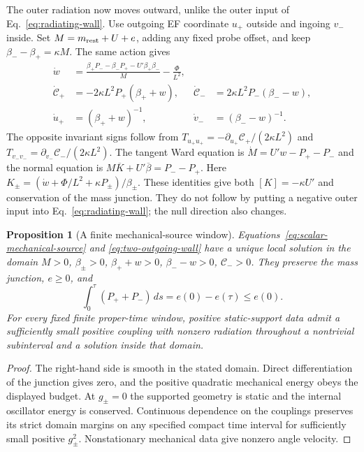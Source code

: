 \documentclass[12pt,a4paper]{article}
\newtheorem{proposition}[theorem]{Proposition}
\begin{document}
The outer radiation now moves outward, unlike the outer input of
Eq.~\eqref{eq:radiating-wall}. Use outgoing EF coordinate $u_+$ outside
and ingoing $v_-$ inside. Set $M=m_{\rm rest}+U+e$, adding any fixed
probe offset, and keep $\beta_--\beta_+=\kappa M$. The same action gives
\begin{align}\label{eq:two-outgoing-wall}
 \dot w&=\frac{\beta_+P_- -\beta_-P_+ -U'\beta_+\beta_-}{M}
                       -\frac\Phi{L^2},\\
 \dot{\mathcal C}_+&=-2\kappa L^2P_+(\beta_++w),&
 \dot{\mathcal C}_-&= 2\kappa L^2P_-(\beta_--w),\nonumber\\
 \dot u_+&=(\beta_++w)^{-1},&
 \dot v_-&=(\beta_--w)^{-1}.\nonumber
\end{align}
The opposite invariant signs follow from
$T_{u_+u_+}=-\partial_{u_+}\mathcal C_+/(2\kappa L^2)$ and
$T_{v_-v_-}=\partial_{v_-}\mathcal C_-/(2\kappa L^2)$.
The tangent Ward equation is $\dot M=U'w-P_+-P_-$ and the normal
equation is $M\overline K+U'\overline\beta=P_--P_+$.
Here $K_\pm=(\dot w+\Phi/L^2+\kappa P_\pm)/\beta_\pm$.
These identities give both $[K]=-\kappa U'$ and conservation of the
mass junction. They do not follow by putting a negative outer input
into Eq.~\eqref{eq:radiating-wall}; the null direction also changes.

\begin{proposition}[A finite mechanical-source window]
\label{prop:mechanical-source-window}
Equations~\eqref{eq:scalar-mechanical-source} and
\eqref{eq:two-outgoing-wall} have a unique local solution in the domain
$M>0$, $\beta_\pm>0$, $\beta_++w>0$, $\beta_--w>0$, $\mathcal C_->0$.
They preserve the mass junction, $e\ge0$, and
\begin{equation}\label{eq:mechanical-source-budget}
 \int_0^\tau(P_++P_-)\,ds=e(0)-e(\tau)\le e(0).
\end{equation}
For every fixed finite proper-time window, positive static-support data
admit a sufficiently small positive coupling with nonzero radiation
throughout a nontrivial subinterval and a solution inside that domain.
\end{proposition}
\begin{proof}
The right-hand side is smooth in the stated domain. Direct differentiation
of the junction gives zero, and the positive quadratic mechanical energy
obeys the displayed budget. At $g_\pm=0$ the supported geometry is static
and the internal oscillator energy is conserved. Continuous dependence
on the couplings preserves its strict domain margins on any specified
compact time interval for sufficiently small positive $g_\pm^2$.
Nonstationary mechanical data give nonzero angle velocity.
\end{proof}
\end{document}

